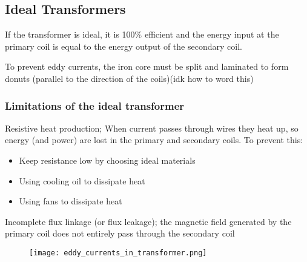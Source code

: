 	\subsection{Ideal Transformers}
	
		If the transformer is ideal, it is 100\% efficient and the energy input at the primary coil is equal to the energy output of the secondary coil.
		
		To prevent eddy currents, the iron core must be split and laminated to form donuts (parallel to the direction of the coils)(idk how to word this)

		\subsubsection{Limitations of the ideal transformer}
		
			Resistive heat production; When current passes through wires they heat up, so energy (and power) are lost in the primary and secondary coils. To prevent this:

			\begin{itemize}
				\item Keep resistance low by choosing ideal materials
				\item Using cooling oil to dissipate heat
				\item Using fans to dissipate heat
			\end{itemize}

			Incomplete flux linkage (or flux leakage); the magnetic field generated by the primary coil does not entirely pass through the secondary coil

		\begin{figure}[H]
			\centering
			\texttt{[image: eddy\_currents\_in\_transformer.png]}
		\end{figure}
